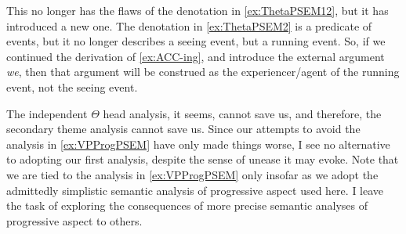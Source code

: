 \documentclass[MilwayThesis]{subfiles}
\begin{document}
This no longer has the flaws of the denotation in \cref{ex:ThetaPSEM12}, but it has introduced a new one.
The denotation in \cref{ex:ThetaPSEM2} is a predicate of events, but it no longer describes a seeing event, but a running event.
So, if we continued the derivation of \cref{ex:ACC-ing}, and introduce the external argument \textit{we}, then that argument will be construed as the experiencer/agent of the running event, not the seeing event.

The independent $\Theta$ head analysis, it seems, cannot save us, and therefore, the secondary theme analysis cannot save us.
Since our attempts to avoid the analysis in \cref{ex:VPProgPSEM} have only made things worse, I see no alternative to adopting our first analysis, despite the sense of unease it may evoke.
Note that we are tied to the analysis in \cref{ex:VPProgPSEM} only insofar as we adopt the admittedly simplistic semantic analysis of progressive aspect used here.
I leave the task of exploring the consequences of more precise semantic analyses of progressive aspect to others.
\end{document}
